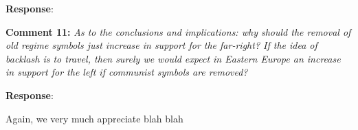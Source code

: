 \documentclass[12pt, a4paper, notitlepage]{article}
\begin{document}
\textbf{Response}: {\color{red}{pending}}

\textbf{Comment 11:} \textit{As to the conclusions and implications: why should the removal of old regime symbols just increase in support for the far-right? If the idea of backlash is to travel, then surely we would expect in Eastern Europe an increase in support for the left if communist symbols are removed?}

\textbf{Response}: {\color{red}{pending}}

\vspace{30pt}

Again, we very much appreciate  blah blah

\newpage


\end{document}
